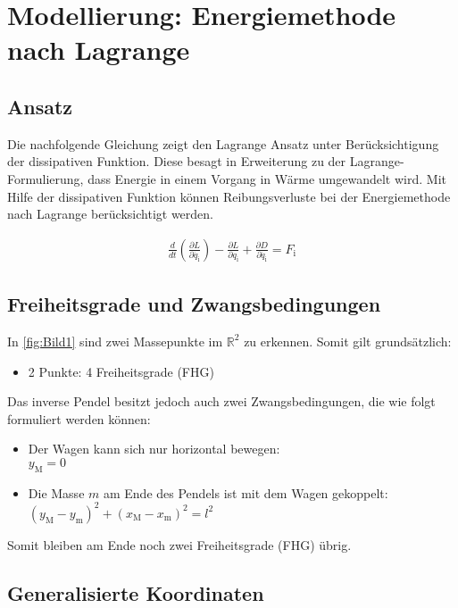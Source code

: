 \section{Modellierung: Energiemethode nach Lagrange}

\subsection{Ansatz}

Die nachfolgende Gleichung zeigt den Lagrange Ansatz unter Berücksichtigung der dissipativen Funktion. Diese besagt in Erweiterung zu der Lagrange-Formulierung, dass Energie in einem Vorgang in Wärme umgewandelt wird. Mit Hilfe der dissipativen Funktion können Reibungsverluste bei der Energiemethode nach Lagrange berücksichtigt werden.

\begin{align} \label{eq:Gleichung1}
    \frac{d}{dt} \left(\frac{\partial L}{\partial \dot{q_{\mathrm{i}}}}\right) - \frac{\partial L}{\partial q_{\mathrm{i}}} + \frac{\partial D}{\partial \dot{q_{\mathrm{i}}}} = F_{\mathrm{i}}
\end{align}

\subsection{Freiheitsgrade und Zwangsbedingungen}

In \autoref{fig:Bild1} sind zwei Massepunkte im $\mathbb{R}^2$ zu erkennen. Somit gilt grundsätzlich:
\begin{itemize}
    \item 2 Punkte: 4 Freiheitsgrade (FHG)
\end{itemize}

Das inverse Pendel besitzt jedoch auch zwei Zwangsbedingungen, die wie folgt formuliert werden können:

\begin{itemize}
    \item Der Wagen kann sich nur horizontal bewegen: \\ $y_{\mathrm{M}} = 0$
    \item Die Masse $m$ am Ende des Pendels ist mit dem Wagen gekoppelt: \\ $(y_{\mathrm{M}} - y_{\mathrm{m}})^2 + (x_{\mathrm{M}} - x_{\mathrm{m}})^2 = l^2$
\end{itemize}

Somit bleiben am Ende noch zwei Freiheitsgrade (FHG) übrig.

\subsection{Generalisierte Koordinaten}

